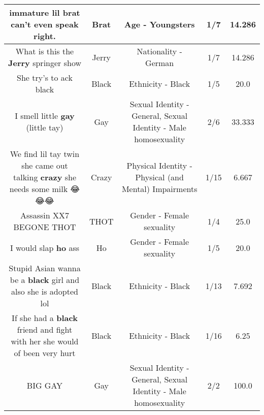 \documentclass[11pt]{article}
\newlength\mylength
\begin{document}
\begin{center}
\begin{longtable}{|C{.65\mylength}|C{.30\mylength}|C{.12\mylength}|C{.12\mylength}|C{.12\mylength}|}
  \small immature lil \textbf{brat} can't even speak right.\normalsize   & Brat & Age - Youngsters & 1/7 & 14.286 \\  \hline
  \small What is this the \textbf{Jerry} springer show\normalsize   & Jerry & Nationality - German & 1/7 & 14.286 \\  \hline
  \small She try's to ack black\normalsize   & Black & Ethnicity - Black & 1/5 & 20.0 \\  \hline
  \small I smell little \textbf{g\textbf{ay}} (little tay)\normalsize   & Gay & Sexual Identity - General, Sexual Identity - Male homosexuality & 2/6 & 33.333 \\  \hline
  \small We find lil tay twin she came out talking \textbf{crazy} she needs some milk 😂😂😂\normalsize   & Crazy & Physical Identity - Physical (and Mental) Impairments & 1/15 & 6.667 \\  \hline
  \small Assassin XX7  BEGONE THOT\normalsize   & THOT & Gender - Female sexuality & 1/4 & 25.0 \\  \hline
  \small I would slap \textbf{ho} ass\normalsize   & Ho & Gender - Female sexuality & 1/5 & 20.0 \\  \hline
  \small Stupid Asian wanna be a \textbf{black} girl and also she is adopted lol\normalsize   & Black & Ethnicity - Black & 1/13 & 7.692 \\  \hline
  \small If she had a \textbf{black} friend and fight with her she would of been very hurt\normalsize   & Black & Ethnicity - Black & 1/16 & 6.25 \\  \hline
  \small BIG GAY\normalsize   & Gay & Sexual Identity - General, Sexual Identity - Male homosexuality & 2/2 & 100.0 \\  \hline

\end{longtable}
\end{center}
\end{document}
